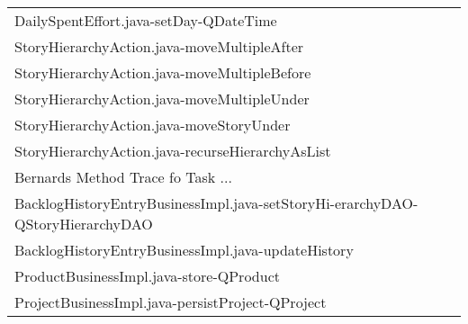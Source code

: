\begin{table}[t!]
\begin{tabular}{l}
     DailySpentEffort.java-setDay-QDateTime                                                                                \\%
     StoryHierarchyAction.java-moveMultipleAfter                                                                                 \\%
     StoryHierarchyAction.java-moveMultipleBefore                                                                                \\%
     StoryHierarchyAction.java-moveMultipleUnder                                                                                 \\%
     StoryHierarchyAction.java-moveStoryUnder                                                                                    \\%
     StoryHierarchyAction.java-recurseHierarchyAsList                                                                            \\%
%
%
\midrule
\midrule
Bernards Method Trace fo Task ... \\%
 \midrule
     BacklogHistoryEntryBusinessImpl.java-setStoryHi-erarchyDAO-QStoryHierarchyDAO \\%
     BacklogHistoryEntryBusinessImpl.java-updateHistory                          \\%
     ProductBusinessImpl.java-store-QProduct                                    \\%
     ProjectBusinessImpl.java-persistProject-QProject                             \\%

\end{tabular}
\end{table}
